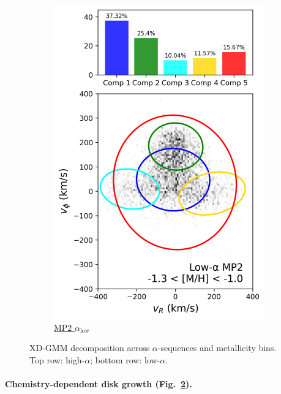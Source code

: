 \documentclass[a4paper,10pt]{article}
\begin{document}
\begin{multicols}{2}
\begin{figure}[H]
\begin{subfigure}[t]{0.24\linewidth}
    \includegraphics[width=\linewidth]{../figures/gmm_mp2_low_alpha_k6.png}
    \caption{\href{https://raw.githack.com/raunaq-rai/Disentangling-the-Milky-Way-using-GMM/main/figures/MP2\_low\_\_\_\_-1.3\%5BM\_H\%5D-1.0.html}{MP2 $\alpha_{\mathrm{low}}$}}
    \label{fig:low_mp2}
  \end{subfigure}


  \caption{XD-GMM decomposition across $\alpha$-sequences and metallicity bins. Top row: high-$\alpha$; bottom row: low-$\alpha$.}
  \label{fig:gmm_alpha_bins}
\end{figure}


\paragraph{Chemistry-dependent disk growth (Fig.~\ref{fig:gmm_alpha_bins}).}


\end{multicols}
\end{document}
